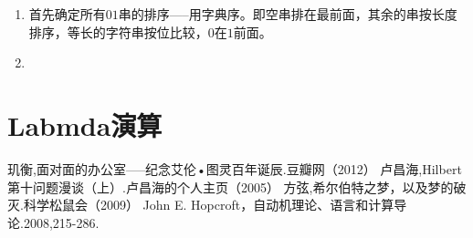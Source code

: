 \documentclass[12pt,a4paper,oneside]{ctexrep}
\theoremstyle{definition}
\begin{document}
\begin{enumerate}
\item 首先确定所有$01$串的排序-----用字典序。即空串排在最前面，其余的串按长度排序，等长的字符串按位比较，$0$在$1$前面。
\item
\end{enumerate}

\chapter{Labmda演算}





\begin{thebibliography}{99}
 玑衡,面对面的办公室-----纪念艾伦•图灵百年诞辰.豆瓣网（2012）
 卢昌海,Hilbert第十问题漫谈（上）.卢昌海的个人主页（2005）
 方弦,希尔伯特之梦，以及梦的破灭.科学松鼠会（2009）
 John E. Hopcroft，自动机理论、语言和计算导论.2008,215-286.
\end{thebibliography}
\end{document}
